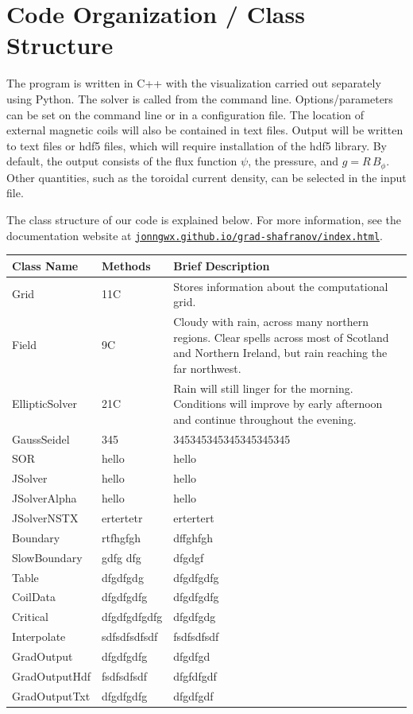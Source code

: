 \documentclass[paper=letter, fontsize=11pt]{scrartcl} %
\begin{document}
\section{Code Organization / Class Structure}

The program is written in C++ with the visualization carried out separately using Python. The solver is called from the command line.  Options/parameters can be set on the command line or in a configuration file.  The location of external magnetic coils will also be contained in text files. Output will be written to text files or hdf5 files, which will require installation of the hdf5 library.  By default, the output consists of the flux function $\psi$, the pressure, and $g = R\,B_{\phi}$.  Other quantities, such as the toroidal current density, can be selected in the input file.

The class structure of our code is explained below.  For more information, see the documentation website at \href{http://jonngwx.github.io/grad-shafranov/index.html}{\nolinkurl{jonngwx.github.io/grad-shafranov/index.html}}.
\begin{center}
    \begin{tabular}{ | l | l | p{5cm} |}
    \hline
    Class Name & Methods & Brief Description \\ \hline
    Grid & 11C & Stores information about the computational grid. \\ \hline
    Field & 9C & Cloudy with rain, across many northern regions. Clear spells
    across most of Scotland and Northern Ireland,
    but rain reaching the far northwest. \\ \hline
    EllipticSolver &  21C & Rain will still linger for the morning.
    Conditions will improve by early afternoon and continue
    throughout the evening. \\ \hline
    GaussSeidel & 345 & 345345345345345345345 \\ \hline
    SOR & hello & hello \\ \hline
    JSolver & hello & hello \\ \hline
    JSolverAlpha & hello & hello \\ \hline
    JSolverNSTX & ertertetr & ertertert \\ \hline
    Boundary & rtfhgfgh & dffghfgh \\ \hline
    SlowBoundary & gdfg dfg & dfgdgf \\ \hline
    Table & dfgdfgdg & dfgdfgdfg \\ \hline
    CoilData & dfgdfgdfg & dfgdfgdfg \\ \hline
    Critical & dfgdfgdfgdfg & dfgdfgdg \\ \hline
    Interpolate & sdfsdfsdfsdf & fsdfsdfsdf \\ \hline
    GradOutput & dfgdfgdfg & dfgdfgd \\ \hline
    GradOutputHdf & fsdfsdfsdf & dfgfdfgdf \\ \hline
    GradOutputTxt & dfgdfgdfg & dfgdfgdf \\ 
    \hline
    \end{tabular}
\end{center}
\end{document}
